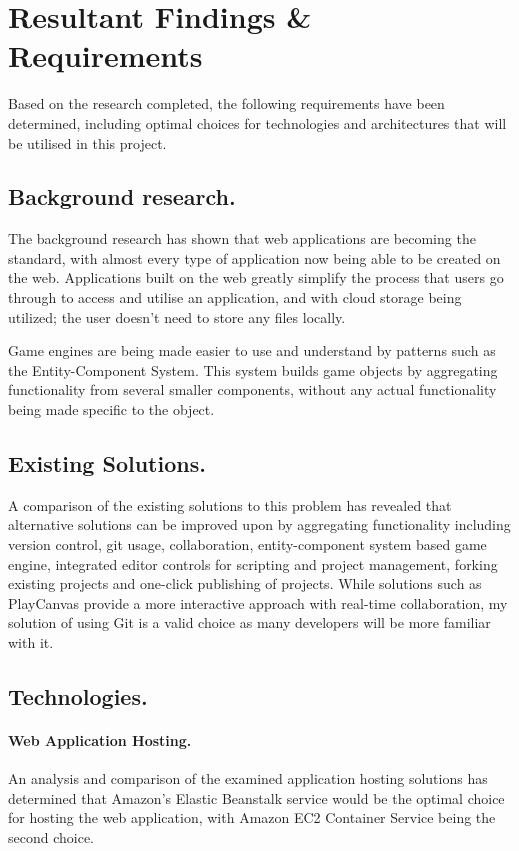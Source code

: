 \section{Resultant Findings \& Requirements}
Based on the research completed, the following requirements have been determined, including optimal choices for technologies and architectures that will be utilised in this project.

\subsection{Background research.}
The background research has shown that web applications are becoming the standard, with almost every type of application now being able to be created on the web. Applications built on the web greatly simplify the process that users go through to access and utilise an application, and with cloud storage being utilized; the user doesn't need to store any files locally.

Game engines are being made easier to use and understand by patterns such as the Entity-Component System. This system builds game objects by aggregating functionality from several smaller components, without any actual functionality being made specific to the object.

\subsection{Existing Solutions.}
A comparison of the existing solutions to this problem has revealed that alternative solutions can be improved upon by aggregating functionality including version control, git usage, collaboration, entity-component system based game engine, integrated editor controls for scripting and project management, forking existing projects and one-click publishing of projects. While solutions such as PlayCanvas provide a more interactive approach with real-time collaboration, my solution of using Git is a valid choice as many developers will be more familiar with it.

\subsection{Technologies.}
\paragraph{Web Application Hosting.}
An analysis and comparison of the examined application hosting solutions has determined that Amazon's Elastic Beanstalk service would be the optimal choice for hosting the web application, with Amazon EC2 Container Service being the second choice.

